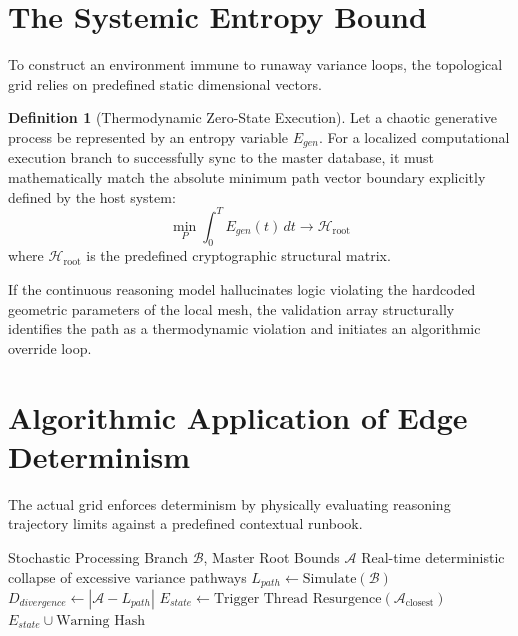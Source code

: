 \documentclass[12pt, a4paper]{article}
\theoremstyle{plain}
\theoremstyle{definition}
\newtheorem{definition}[theorem]{Definition}
\begin{document}
\section{The Systemic Entropy Bound}
To construct an environment immune to runaway variance loops, the topological grid relies on predefined static dimensional vectors.

\begin{definition}[Thermodynamic Zero-State Execution]
Let a chaotic generative process be represented by an entropy variable $E_{gen}$. For a localized computational execution branch to successfully sync to the master database, it must mathematically match the absolute minimum path vector boundary explicitly defined by the host system:
\begin{equation}
    \min_{P} \int_{0}^{T} E_{gen}(t) \, dt \to \mathcal{H}_{\text{root}}
\end{equation}
where $\mathcal{H}_{\text{root}}$ is the predefined cryptographic structural matrix. 
\end{definition}

If the continuous reasoning model hallucinates logic violating the hardcoded geometric parameters of the local mesh, the validation array structurally identifies the path as a thermodynamic violation and initiates an algorithmic override loop.

\section{Algorithmic Application of Edge Determinism}
The actual grid enforces determinism by physically evaluating reasoning trajectory limits against a predefined contextual runbook.

\begin{algorithm}[H]
\caption{Distributed Entropy Truncation Algorithm}
\begin{algorithmic}[1]
\Require Stochastic Processing Branch $\mathcal{B}$, Master Root Bounds $\mathcal{A}$
\Ensure Real-time deterministic collapse of excessive variance pathways
\State $L_{path} \gets \text{Simulate}(\mathcal{B})$
\State $D_{divergence} \gets | \mathcal{A} - L_{path} |$
    \State {}
    \State $E_{state} \gets \text{Trigger Thread Resurgence}(\mathcal{A}_{\text{closest}})$
    \State \Return $E_{state} \cup \text{Warning Hash}$
\EndIf
\State {}
\end{algorithmic}
\label{alg:chaos_bound}
\end{algorithm}
\end{document}
